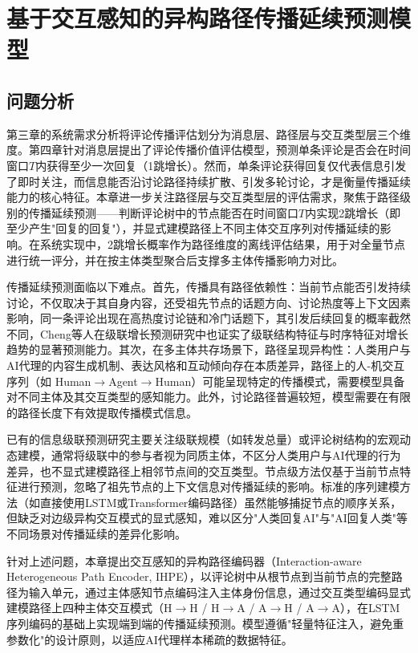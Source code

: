 \chapter{基于交互感知的异构路径传播延续预测模型}

\section{问题分析}

第三章的系统需求分析将评论传播评估划分为消息层、路径层与交互类型层三个维度。第四章针对消息层提出了评论传播价值评估模型，预测单条评论是否会在时间窗口$T$内获得至少一次回复（1跳增长）。然而，单条评论获得回复仅代表信息引发了即时关注，而信息能否沿讨论路径持续扩散、引发多轮讨论，才是衡量传播延续能力的核心特征\cite{ziegler2019predicting}。本章进一步关注路径层与交互类型层的评估需求，聚焦于路径级别的传播延续预测——判断评论树中的节点能否在时间窗口$T$内实现2跳增长（即至少产生"回复的回复"），并显式建模路径上不同主体交互序列对传播延续的影响。在系统实现中，2跳增长概率作为路径维度的离线评估结果，用于对全量节点进行统一评分，并在按主体类型聚合后支撑多主体传播影响力对比。

传播延续预测面临以下难点。首先，传播具有路径依赖性：当前节点能否引发持续讨论，不仅取决于其自身内容，还受祖先节点的话题方向、讨论热度等上下文因素影响，同一条评论出现在高热度讨论链和冷门话题下，其引发后续回复的概率截然不同，Cheng等人\cite{cheng2014cascades}在级联增长预测研究中也证实了级联结构特征与时序特征对增长趋势的显著预测能力。其次，在多主体共存场景下，路径呈现异构性：人类用户与AI代理的内容生成机制、表达风格和互动倾向存在本质差异，路径上的人-机交互序列（如 Human$\to$Agent$\to$Human）可能呈现特定的传播模式，需要模型具备对不同主体及其交互类型的感知能力。此外，讨论路径普遍较短，模型需要在有限的路径长度下有效提取传播模式信息。

已有的信息级联预测研究\cite{cheng2014cascades,medvedev2020modelling}主要关注级联规模（如转发总量）或评论树结构的宏观动态建模，通常将级联中的参与者视为同质主体，不区分人类用户与AI代理的行为差异，也不显式建模路径上相邻节点间的交互类型。节点级方法仅基于当前节点特征进行预测，忽略了祖先节点的上下文信息对传播延续的影响。标准的序列建模方法（如直接使用LSTM或Transformer编码路径）虽然能够捕捉节点的顺序关系，但缺乏对边级异构交互模式的显式感知，难以区分"人类回复AI"与"AI回复人类"等不同场景对传播延续的差异化影响。

针对上述问题，本章提出交互感知的异构路径编码器（Interaction-aware Heterogeneous Path Encoder, IHPE），以评论树中从根节点到当前节点的完整路径为输入单元，通过主体感知节点编码注入主体身份信息，通过交互类型编码显式建模路径上四种主体交互模式（H$\to$H / H$\to$A / A$\to$H / A$\to$A），在LSTM序列编码的基础上实现端到端的传播延续预测。模型遵循"轻量特征注入，避免重参数化"的设计原则，以适应AI代理样本稀疏的数据特征。

